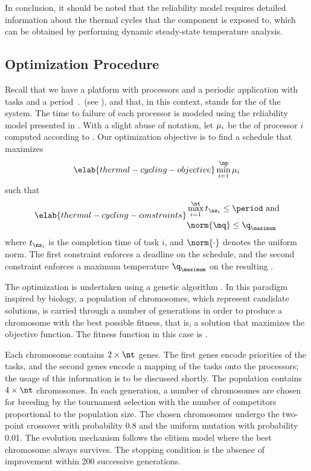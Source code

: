 In conclusion, it should be noted that the reliability model requires detailed
information about the thermal cycles that the component is exposed to, which can
be obtained by performing dynamic steady-state temperature analysis.

\subsection{Optimization Procedure}

Recall that we have a platform with \np processors and a periodic application
with \nt tasks and a period $\period$ (see ), and that, in
this context, \mq stands for the  of the system. The time to failure
of each processor is modeled using the reliability model presented in
. With a slight abuse of notation, let $\mu_i$ be the
 of processor $i$ computed according to .
Our optimization objective is to find a schedule that maximizes
\begin{equation} \elab{thermal-cycling-objective}
  \min_{i = 1}^\np \mean_i
\end{equation}
such that
\begin{align} \elab{thermal-cycling-constraints}
  \begin{split}
    & \max_{i = 1}^\nt t_{\ns_i} \leq \period \text{ and} \\
    & \norm{\mq} \leq \q_\maximum
  \end{split}
\end{align}
where $t_{\ns_i}$ is the completion time of task $i$, and $\norm{\cdot}$ denotes
the uniform norm. The first constraint enforces a deadline on the schedule, and
the second constraint enforces a maximum temperature $\q_\maximum$ on the
resulting \mq.

The optimization is undertaken using a genetic algorithm \cite{schmitz2004}. In
this paradigm inspired by biology, a population of chromosomes, which represent
candidate solutions, is carried through a number of generations in order to
produce a chromosome with the best possible fitness, that is, a solution that
maximizes the objective function. The fitness function in this case is
.

Each chromosome contains $2 \times \nt$ genes. The first \nt genes encode
priorities of the tasks, and the second \nt genes encode a mapping of the tasks
onto the processors; the usage of this information is to be discussed shortly.
The population contains $4 \times \nt$ chromosomes. In each generation, a number
of chromosomes are chosen for breeding by the tournament selection with the
number of competitors proportional to the population size. The chosen
chromosomes undergo the two-point crossover with probability 0.8 and the uniform
mutation with probability 0.01. The evolution mechanism follows the elitism
model where the best chromosome always survives. The stopping condition is the
absence of improvement within 200 successive generations.

